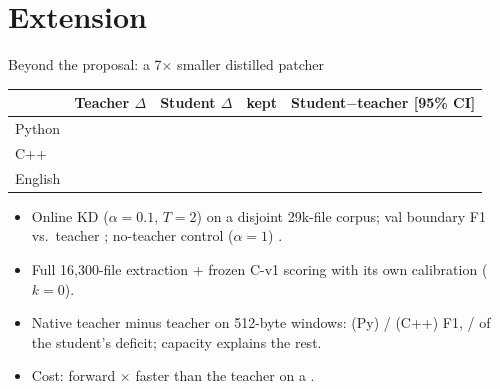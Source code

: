 \documentclass[aspectratio=169,11pt]{beamer}
\begin{document}
\section{Extension}
\begin{frame}{Beyond the proposal: a 7$\times$ smaller distilled patcher}
\centering\small
\begin{tabular}{lrrrl}
\toprule
& Teacher $\Delta$ & Student $\Delta$ & kept & Student$-$teacher [95\% CI] \\
\midrule
Python & \MarginPy{} & \xStuMarginPy{} & \xStuRetainPy{} & \xStuDiffPy{} \xStuDiffCIPy{} \\
C++ & \MarginCpp{} & \xStuMarginCpp{} & \xStuRetainCpp{} & \xStuDiffCpp{} \xStuDiffCICpp{} \\
English & \MarginEn{} & \xStuMarginEn{} & \xStuRetainEn{} & \xStuDiffEn{} \xStuDiffCIEn{} \\
\bottomrule
\end{tabular}
\begin{itemize}\small
\item Online KD ($\alpha=0.1$, $T=2$) on a disjoint 29k-file corpus; val boundary F1 vs.\ teacher \xDistFone{}; no-teacher control ($\alpha=1$) \xAlphaFone{}.
\item Full 16{,}300-file extraction + frozen C-v1 scoring with its own calibration ($k=0$).
\item Native teacher minus teacher on 512-byte windows: \xTfiveDiffPy{} (Py) / \xTfiveDiffCpp{} (C++) F1, \xTfiveSharePy{} / \xTfiveShareCpp{} of the student's deficit; capacity explains the rest.
\item Cost: forward \xEffForward{}$\times$ faster than the teacher on a \xEffGpu{}.
\end{itemize}
\end{frame}
\end{document}
